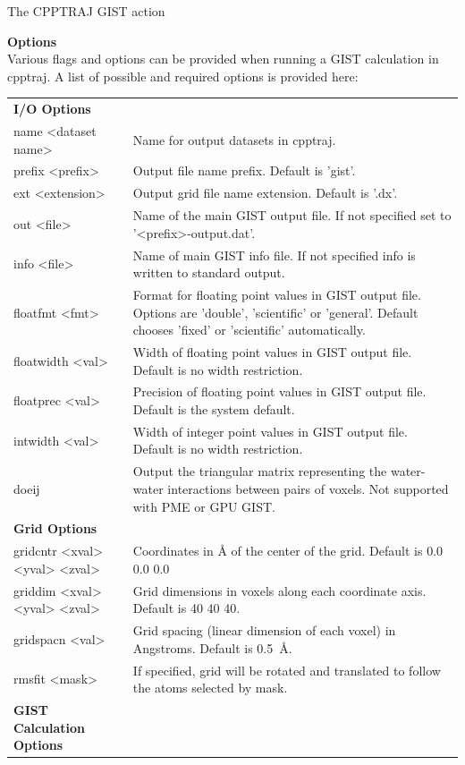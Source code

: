 \documentclass[9pt,tutorial,pubversion]{livecoms}
\begin{document}
\FloatBarrier
\begin{Checklists*}[h!]
\begin{checklist}{The CPPTRAJ GIST action}\label{cheatsheet}

\textbf{Options}\\
Various flags and options can be provided when running a GIST calculation in cpptraj. 
A list of possible and required options is provided here:
\medskip

\begin{tabularx}{\textwidth}{@{}l X @{} }
\toprule
\textbf{I/O Options} &\\
name <dataset name> & Name for output datasets in cpptraj. \\
prefix <prefix> & Output file name prefix. Default is 'gist'.\\
ext <extension> & Output grid file name extension. Default is  '.dx'. \\
out <file> & Name of the main GIST output file. If not specified set to '<prefix>-output.dat'.\\
info <file> & Name of main GIST info file. If not specified info is written to standard output. \\
floatfmt <fmt> & Format for floating point values in GIST output file. Options are 'double', 'scientific' or 'general'. Default chooses 'fixed' or 'scientific' automatically. \\
floatwidth <val>& Width of floating point values in GIST output file. Default is no width restriction. \\
floatprec <val>& Precision of floating point values in GIST output file. Default is the system default. \\
intwidth <val>& Width of integer point values in GIST output file. Default is no width restriction. \\
doeij & Output the triangular matrix representing the water-water 
interactions between pairs of voxels. Not supported with PME or GPU GIST.\\

\textbf{Grid Options} &\\
gridcntr <xval> <yval> <zval> & Coordinates in \AA{} of the center of the grid. Default is 0.0 0.0 0.0 \\
griddim <xval> <yval> <zval> & Grid dimensions in voxels along each coordinate axis. Default is 40 40 40.\\
gridspacn <val> & Grid spacing (linear dimension of each voxel) in 
Angstroms. Default is \qty{0.5}{\angstrom}.\\
rmsfit <mask> & If specified, grid will be rotated and translated to follow the atoms selected by mask. \\
\textbf{GIST Calculation Options} &\\


\end{tabularx}
\end{checklist}
\end{Checklists*}
\end{document}
